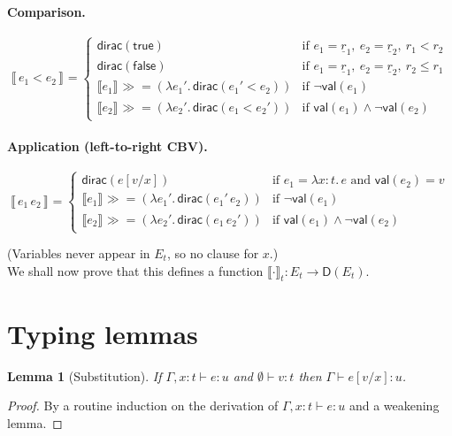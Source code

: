 \documentclass[11pt]{article}
\newtheorem{lemma}[theorem]{Lemma}
\newcommand{\D}{\mathsf{D}}
\newcommand{\dirac}{\mathsf{dirac}}
\newcommand{\bind}{\mathbin{\gg\!=}}
\newcommand{\sem}[2][]{\llbracket #2 \rrbracket_{#1}}
\newcommand{\E}[1]{E_{#1}}
\newcommand{\ty}[1]{\mathsf{#1}}
\newcommand{\val}{\mathsf{val}}
\newcommand{\ul}[1]{\underline{#1}} %
\begin{document}
\paragraph{Comparison.}
\[
\sem{\,e_1{<}e_2\,}
=
\begin{cases}
\dirac(\ty{true})  & \text{if } e_1=\ul r_1,\ e_2=\ul r_2,\ r_1<r_2\\
\dirac(\ty{false}) & \text{if } e_1=\ul r_1,\ e_2=\ul r_2,\ r_2\le r_1\\[0.4ex]
\sem{e_1}\bind (\lambda e_1'.\, \dirac(e_1'{<}e_2)) & \text{if } \neg\val(e_1)\\
\sem{e_2}\bind (\lambda e_2'.\, \dirac(e_1{<}e_2')) & \text{if } \val(e_1)\wedge \neg\val(e_2)
\end{cases}
\]

\paragraph{Application (left-to-right CBV).}
\[
\sem{\,e_1\,e_2\,}
=
\begin{cases}
\dirac(e[v/x]) & \text{if } e_1=\lambda x{:}t.\,e \text{ and } \val(e_2)=v\\
\sem{e_1}\bind (\lambda e_1'.\, \dirac(e_1'\,e_2)) & \text{if } \neg\val(e_1)\\
\sem{e_2}\bind (\lambda e_2'.\, \dirac(e_1\,e_2')) & \text{if } \val(e_1)\wedge \neg\val(e_2)
\end{cases}
\]

\bigskip
\noindent
(Variables never appear in $\E{t}$, so no clause for $x$.)
\\[1em]
We shall now prove that this defines a function $\sem[t]{\cdot}:\E{t}\to \D(\E{t})$.

\section*{Typing lemmas}

\begin{lemma}[Substitution]\label{lem:subst}
If $\Gamma,x{:}t\vdash e:u$ and $\emptyset\vdash v:t$ then $\Gamma\vdash e[v/x]:u$.
\end{lemma}
\begin{proof}
By a routine induction on the derivation of $\Gamma,x{:}t\vdash e:u$ and a weakening lemma.
\end{proof}
\end{document}
